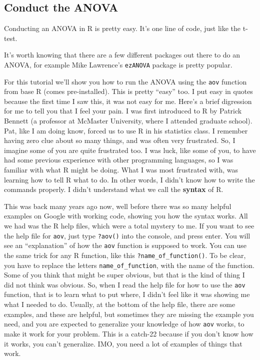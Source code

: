 \documentclass[]{book}
\begin{document}
\subsection{Conduct the ANOVA}\label{conduct-the-anova}

Conducting an ANOVA in R is pretty easy. It's one line of code, just
like the t-test.

It's worth knowing that there are a few different packages out there to
do an ANOVA, for example Mike Lawrence's \texttt{ezANOVA} package is
pretty popular.

For this tutorial we'll show you how to run the ANOVA using the
\texttt{aov} function from base R (comes pre-installed). This is pretty
``easy'' too. I put easy in quotes because the first time I saw this, it
was not easy for me. Here's a brief digression for me to tell you that I
feel your pain. I was first introduced to R by Patrick Bennett (a
professor at McMaster University, where I attended graduate school).
Pat, like I am doing know, forced us to use R in his statistics class. I
remember having zero clue about so many things, and was often very
frustrated. So, I imagine some of you are quite frustrated too. I was
luck, like some of you, to have had some previous experience with other
programming languages, so I was familiar with what R might be doing.
What I was most frustrated with, was learning how to tell R what to do.
In other words, I didn't know how to write the commands properly. I
didn't understand what we call the \textbf{syntax} of R.

This was back many years ago now, well before there was so many helpful
examples on Google with working code, showing you how the syntax works.
All we had was the R help files, which were a total mystery to me. If
you want to see the help file for \texttt{aov}, just type
\texttt{?aov()} into the console, and press enter. You will see an
``explanation'' of how the \texttt{aov} function is supposed to work.
You can use the same trick for any R function, like this
\texttt{?name\_of\_function()}. To be clear, you have to replace the
letters \texttt{name\_of\_function}, with the name of the function. Some
of you think that might be super obvious, but that is the kind of thing
I did not think was obvious. So, when I read the help file for how to
use the \texttt{aov} function, that is to learn what to put where, I
didn't feel like it was showing me what I needed to do. Usually, at the
bottom of the help file, there are some examples, and these are helpful,
but sometimes they are missing the example you need, and you are
expected to generalize your knowledge of how \texttt{aov} works, to make
it work for your problem. This is a catch-22 because if you don't know
how it works, you can't generalize. IMO, you need a lot of examples of
things that work.
\end{document}
